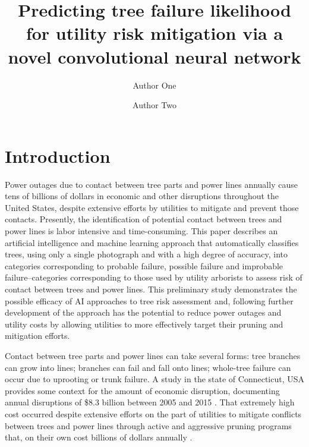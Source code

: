 \documentclass[Journal, letterpaper]{ascelike-new}
\newcommand{\?}{\stackrel{?}{=}}
\begin{document}
\title{Predicting tree failure likelihood for utility risk mitigation via a novel convolutional neural network}
\author[1]{Author One}
\author[2]{Author Two}


\maketitle

\begin{abstract}
    
\end{abstract}
\section{Introduction}
Power outages due to contact between tree parts and power lines annually cause tens of billions of dollars in economic and other disruptions throughout the United States, despite extensive efforts by utilities to mitigate and prevent those contacts.  Presently, the identification of potential contact between trees and power lines is labor intensive and time-consuming.  This paper describes an artificial intelligence and machine learning approach that automatically classifies trees, using only a single photograph and with a high degree of accuracy, into categories corresponding to probable failure, possible failure and improbable failure--categories corresponding to those used by utility arborists to assess risk of contact between trees and power lines.  This preliminary study demonstrates the possible efficacy of AI approaches to tree risk assessment and, following further development of the approach has the potential to reduce power outages and utility costs by allowing utilities to more effectively target their pruning and mitigation efforts.  

Contact between tree parts and power lines can take several forms: tree branches can grow into lines; branches can fail and fall onto lines; whole-tree failure can occur due to uprooting or trunk failure.  A study in the state of Connecticut, USA provides some context for the amount of economic disruption, documenting annual disruptions of \$8.3 billion between 2005 and 2015 \cite{graziano2020wider}.  That extremely high cost occurred despite extensive efforts on the part of utilities to mitigate conflicts between trees and power lines through active and aggressive pruning programs that, on their own cost billions of dollars annually \cite{guggenmoos2003effects}.  
\end{document}
